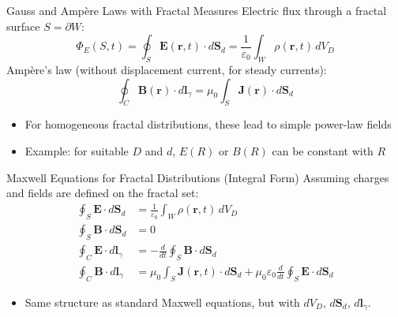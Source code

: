 \documentclass[11pt]{beamer}
\begin{document}
\begin{frame}{Gauss and Amp\`ere Laws with Fractal Measures}
Electric flux through a fractal surface $S = \partial W$:
\begin{equation*}
  \Phi_E(S,t) = \oint_S \bm E(\bm r,t) \cdot d\bm S_d
  = \frac{1}{\varepsilon_0} \int_W \rho(\bm r,t)\, dV_D
\end{equation*}
Amp\`ere’s law (without displacement current, for steady currents):
\begin{equation*}
  \oint_C \bm B(\bm r) \cdot d\bm l_\gamma
  = \mu_0 \int_S \bm J(\bm r)\cdot d\bm S_d
\end{equation*}
\begin{itemize}
  \item For homogeneous fractal distributions, these lead to simple power-law fields
  \item Example: for suitable $D$ and $d$, $E(R)$ or $B(R)$ can be constant with $R$
\end{itemize}
\end{frame}

\begin{frame}{Maxwell Equations for Fractal Distributions (Integral Form)}
Assuming charges and fields are defined on the fractal set:
\begin{align*}
  \oint_S \bm E \cdot d\bm S_d
    &= \frac{1}{\varepsilon_0} \int_W \rho(\bm r,t)\, dV_D \\
  \oint_S \bm B \cdot d\bm S_d
    &= 0 \\
  \oint_C \bm E \cdot d\bm l_\gamma
    &= -\frac{d}{dt} \oint_S \bm B \cdot d\bm S_d \\
  \oint_C \bm B \cdot d\bm l_\gamma
    &= \mu_0 \int_S \bm J(\bm r,t)\cdot d\bm S_d
       + \mu_0 \varepsilon_0 \frac{d}{dt} \oint_S \bm E \cdot d\bm S_d
\end{align*}
\begin{itemize}
  \item Same structure as standard Maxwell equations, but with $dV_D$, $d\bm S_d$, $d\bm l_\gamma$.
\end{itemize}
\end{frame}
\end{document}

